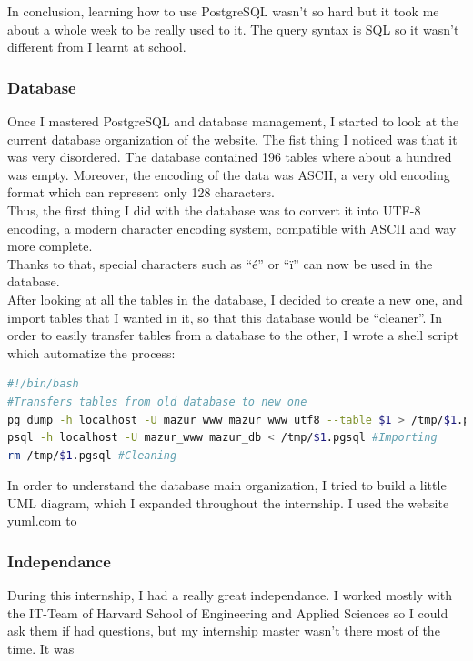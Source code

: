 \documentclass[10pt,a4paper]{article}
\newcommand{\hseas}{Harvard School of Engineering and Applied Sciences}
\begin{document}
In conclusion, learning how to use PostgreSQL wasn't so hard but it took me about a whole week to be really used to it. The query syntax is SQL so it wasn't different from I learnt at school.

\subsubsection*{Database}
Once I mastered PostgreSQL and database management, I started to look at the current database organization of the website. The fist thing I noticed was that it was very disordered. The database contained 196 tables where about a hundred was empty. Moreover, the encoding of the data was ASCII, a very old encoding format which can represent only 128 characters.\\
Thus, the first thing I did with the database was to convert it into UTF-8 encoding, a modern character encoding system, compatible with ASCII and way more complete.\\ Thanks to that, special characters such as ``é'' or ``ï'' can now be used in the database.\\

After looking at all the tables in the database, I decided to create a new one, and import tables that I wanted in it, so that this database would be ``cleaner''. In order to easily transfer tables from a database to the other, I wrote a shell script which automatize the process:\\

\begin{lstlisting}[language=bash]
#!/bin/bash
#Transfers tables from old database to new one
pg_dump -h localhost -U mazur_www mazur_www_utf8 --table $1 > /tmp/$1.pgsql #Exporting
psql -h localhost -U mazur_www mazur_db < /tmp/$1.pgsql #Importing
rm /tmp/$1.pgsql #Cleaning
\end{lstlisting}

In order to understand the database main organization, I tried to build a little UML diagram, which I expanded throughout the internship. I used the website yuml.com%
to


\subsubsection*{Independance}
During this internship, I had a really great independance. I worked mostly with the IT-Team of \hseas{} so I could ask them if had questions, but my internship master wasn't there most of the time. It was
\end{document}
